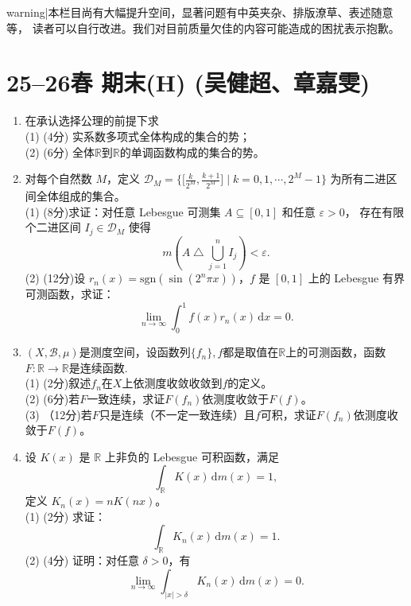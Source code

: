 \theoremstyle{remark}\newtheorem*{remark*}{注}

{{warning|本栏目尚有大幅提升空间，显著问题有中英夹杂、排版潦草、表述随意等，
读者可以自行改进。我们对目前质量欠佳的内容可能造成的困扰表示抱歉。}}

\section{25--26春 期末(H) (吴健超、章嘉雯)}
\begin{enumerate}
\item 在承认选择公理的前提下求\\(1) (4分) 实系数多项式全体构成的集合的势；\\(2) (6分) 全体$\mathbb{R}$到$\mathbb{R}$的单调函数构成的集合的势。
\item 对每个自然数 $M$，定义 $\mathcal{D}_{M} = \big\{ \big[\frac{k}{2^{M}}, \frac{k + 1}{2^{M}}\big] \mid k = 0, 1, \cdots, 2^{M} - 1 \big\}$ 为所有二进区间全体组成的集合。\\
(1) (8分)求证：对任意 Lebesgue 可测集 $A \subseteq [0, 1]$ 和任意 $\varepsilon > 0$，
存在有限个二进区间 $I_{j} \in \mathcal{D}_{M}$ 使得 
\[m(A \mathop{\triangle} \bigcup_{j = 1}^{n}I_{j}) < \varepsilon.\]
(2) (12分)设 $r_{n}(x) = \mathrm{sgn}(\sin(2^{n}\pi x))$，$f$ 是 $[0, 1]$ 上的 Lebesgue 有界可测函数，求证：
$$\lim_{n \to \infty}\int_{0}^{1}f(x)r_{n}(x)\,\text{d} x = 0.$$
\item $(X,\mathcal{B},\mu)$是测度空间，设函数列$\{f_n\},f$都是取值在$\mathbb{R}$上的可测函数，函数$F:\mathbb{R}\to\mathbb{R}$是连续函数.\\
(1) (2分)叙述$f_n$在$X$上依测度收敛收敛到$f$的定义。\\(2) (6分)若$F$一致连续，求证$F(f_n)$依测度收敛于$F(f)$。\\(3) （12分)若$F$只是连续（不一定一致连续）且$f$可积，求证$F(f_n)$依测度收敛于$F(f)$。
\item 设 $K(x)$ 是 $\mathbb{R}$ 上非负的 Lebesgue 可积函数，满足
\[\int_{\mathbb{R}}K(x)\,\text{d} m(x) = 1,\]
定义 $K_{n}(x) = nK(nx)$。\\
(1) (2分) 求证：\[\int_{\mathbb{R}}K_{n}(x)\,\text{d} m(x) = 1.\]
(2) (4分) 证明：对任意 $\delta > 0$，有 \[\lim_{n \rightarrow \infty}\int_{|x| > \delta}K_{n}(x)\,\text{d} m(x) = 0.\]

\end{enumerate}

